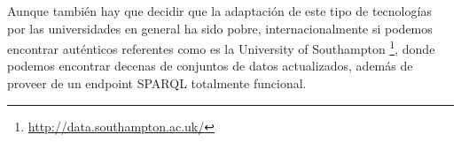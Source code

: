 \bigskip
Aunque también hay que decidir que la adaptación de este tipo de tecnologías por las universidades en general ha sido pobre, internacionalmente si podemos encontrar auténticos referentes como es la {\sf University of Southampton} \footnote{\url{http://data.southampton.ac.uk/}}, donde podemos encontrar decenas de conjuntos de datos actualizados, además de proveer de un endpoint {\sf SPARQL} totalmente funcional.